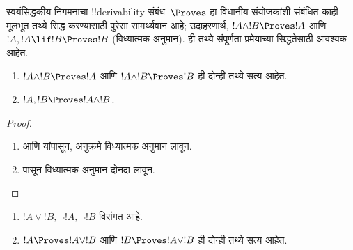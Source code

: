 \documentclass[../../../include/open-logic-section]{subfiles}
\begin{document}
      {}
      {}


\begin{explain}
  स्वयंसिद्धकीय निगमनाचा !!{derivability} संबंध~$\Proves$ हा विधानीय
  संयोजकांशी संबंधित काही मूलभूत तथ्ये सिद्ध करण्यासाठी पुरेसा सामर्थ्यवान
  आहे; उदाहरणार्थ, $!A \land !B \Proves !A$ आणि $!A, !A \lif !B
  \Proves !B$ (विध्यात्मक अनुमान). ही तथ्ये संपूर्णता प्रमेयाच्या
  सिद्धतेसाठी आवश्यक आहेत.
\end{explain}

\begin{prop}
  \begin{enumerate}
  \item {} $!A \land !B \Proves
    !A$ आणि $!A \land !B \Proves !B$ ही दोन्ही तथ्ये सत्य आहेत.
  \item {} $!A, !B \Proves !A \land !B$.
  \end{enumerate}
\end{prop}

\begin{proof}
  \begin{enumerate}
    \item {} आणि  यांपासून,
      अनुक्रमे विध्यात्मक अनुमान लावून.
  \item {} पासून विध्यात्मक अनुमान दोनदा लावून.
  \end{enumerate}
\end{proof}


\begin{prop}
  \begin{enumerate}
  \item $!A \lor !B, \lnot !A, \lnot !B$ विसंगत आहे.
  \item $!A \Proves !A \lor !B$ आणि $!B \Proves !A \lor !B$ ही दोन्ही
    तथ्ये सत्य आहेत.
  \end{enumerate}
\end{prop}
\end{document}
